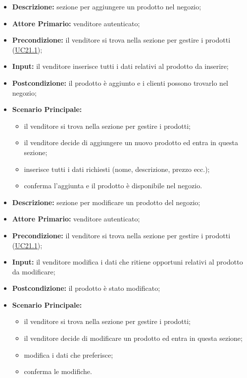         \begin{itemize}
            \item \textbf{Descrizione:} sezione per aggiungere un prodotto nel negozio;
            \item \textbf{Attore Primario:} venditore autenticato;
            \item \textbf{Precondizione:} il venditore si trova nella sezione per gestire i prodotti (\hyperref[sec:UC21.1]{\underline{UC21.1}});
            \item \textbf{Input:} il venditore inserisce tutti i dati relativi al prodotto da inserire;
            \item \textbf{Postcondizione:} il prodotto è aggiunto e i clienti possono trovarlo nel negozio;
            \item \textbf{Scenario Principale:} 
                \begin{itemize}
                    \item il venditore si trova nella sezione per gestire i prodotti;
                    \item il venditore decide di aggiungere un nuovo prodotto ed entra in questa sezione;
                    \item inserisce tutti i dati richiesti (nome, descrizione, prezzo ecc.);
                    \item conferma l'aggiunta e il prodotto è disponibile nel negozio.
                \end{itemize}
        \end{itemize}
        \begin{itemize}
            \item \textbf{Descrizione:} sezione per modificare un prodotto del negozio;
            \item \textbf{Attore Primario:} venditore autenticato;
            \item \textbf{Precondizione:} il venditore si trova nella sezione per gestire i prodotti (\hyperref[sec:UC21.1]{\underline{UC21.1}});
            \item \textbf{Input:} il venditore modifica i dati che ritiene opportuni relativi al prodotto da modificare;
            \item \textbf{Postcondizione:} il prodotto è stato modificato;
            \item \textbf{Scenario Principale:} 
                \begin{itemize}
                    \item il venditore si trova nella sezione per gestire i prodotti;
                    \item il venditore decide di modificare un prodotto ed entra in questa sezione;
                    \item modifica i dati che preferisce;
                    \item conferma le modifiche.
                \end{itemize}
        \end{itemize}
